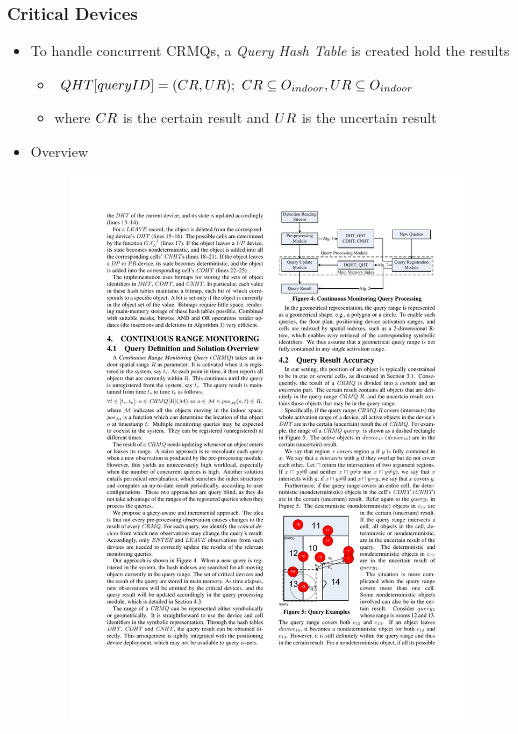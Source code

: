 \begin{frame}
\frametitle{Critical Devices}

\begin{itemize}
  \item To handle concurrent \textrm{CRMQ}s, a \emph{Query Hash Table} is created hold the results
    \begin{itemize}
      \item $\mathnormal{QHT[queryID] = (CR, UR);~ CR \subseteq O_{indoor}, UR \subseteq O_{indoor}}$
      \item where $\mathnormal{CR}$ is the certain result and $\mathnormal{UR}$ is the uncertain result
    \end{itemize}
  \item Overview
    \begin{figure}[tb]
      \includegraphics[width=0.68\columnwidth]{figures/2-2/2-2-6.pdf}
    \end{figure}
\end{itemize}

\end{frame}

